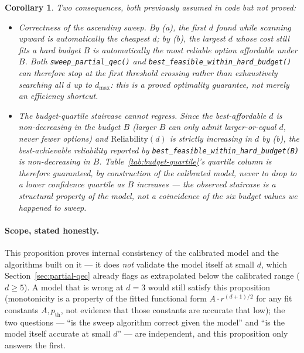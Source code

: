 \documentclass[9pt,twocolumn]{extarticle}
\newtheorem{corollary}{Corollary}
\begin{document}
\begin{corollary}
Two consequences, both previously assumed in code but not proved:
\begin{itemize}
\item \emph{Correctness of the ascending sweep.} By (a), the first
$d$ found while scanning upward is automatically the cheapest $d$; by
(b), the largest $d$ whose cost still fits a hard budget $B$ is
automatically the most reliable option affordable under $B$. Both
\texttt{sweep\_partial\_qec()} and
\texttt{best\_feasible\_within\_hard\_budget()} can therefore stop at the
first threshold crossing rather than exhaustively searching all $d$ up to
$d_{\max}$: this is a proved optimality guarantee, not merely an
efficiency shortcut.
\item \emph{The budget-quartile staircase cannot regress.} Since the
best-affordable $d$ is non-decreasing in the budget $B$ (larger $B$ can
only admit larger-or-equal $d$, never fewer options) and
$\mathrm{Reliability}(d)$ is strictly increasing in $d$ by (b), the
best-achievable reliability reported by
\texttt{best\_feasible\_within\_hard\_budget(B)} is non-decreasing in
$B$. Table~\ref{tab:budget-quartile}'s quartile column is therefore
guaranteed, by construction of the calibrated model, never to drop to a
lower confidence quartile as $B$ increases --- the observed staircase is
a structural property of the model, not a coincidence of the six budget
values we happened to sweep.
\end{itemize}
\end{corollary}

\paragraph{Scope, stated honestly.} This proposition proves internal
consistency of the calibrated model and the algorithms built on it --- it
does \emph{not} validate the model itself at small $d$, which
Section~\ref{sec:partial-qec} already flags as extrapolated below the
calibrated range ($d\geq5$). A model that is wrong at $d=3$ would
still satisfy this proposition (monotonicity is a property of the fitted
functional form $A\cdot r^{(d+1)/2}$ for any fit constants $A,p_{\mathrm{th}}$,
not evidence that those constants are accurate that low); the two
questions --- ``is the sweep algorithm correct given the model'' and ``is
the model itself accurate at small $d$'' --- are independent, and this
proposition only answers the first.

\FloatBarrier
\end{document}
